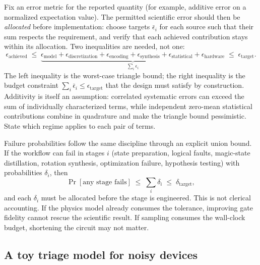 Fix an error metric for the reported quantity (for example, additive error on a normalized expectation value). The permitted scientific error should then be \emph{allocated} before implementation: choose targets $\bar\epsilon_i$ for each source such that their sum respects the requirement, and verify that each achieved contribution stays within its allocation. Two inequalities are needed, not one:
\begin{equation}
\epsilon_{\mathrm{achieved}}
\;\leq\;
\underbrace{\epsilon_{\mathrm{model}}
+\epsilon_{\mathrm{discretization}}
+\epsilon_{\mathrm{encoding}}
+\epsilon_{\mathrm{synthesis}}
+\epsilon_{\mathrm{statistical}}
+\epsilon_{\mathrm{hardware}}}_{\textstyle\sum_i \epsilon_i}
\;\leq\;
\epsilon_{\mathrm{target}}.
\label{eq:error-budget}
\end{equation}
The left inequality is the worst-case triangle bound; the right inequality is the budget constraint $\sum_i\bar\epsilon_i\leq\epsilon_{\mathrm{target}}$ that the design must satisfy by construction. Additivity is itself an assumption: correlated systematic errors can exceed the sum of individually characterized terms, while independent zero-mean statistical contributions combine in quadrature and make the triangle bound pessimistic. State which regime applies to each pair of terms.

Failure probabilities follow the same discipline through an explicit union bound. If the workflow can fail in stages $i$ (state preparation, logical faults, magic-state distillation, rotation synthesis, optimization failure, hypothesis testing) with probabilities $\delta_i$, then
\begin{equation}
\Pr[\text{any stage fails}]\;\leq\;\sum_i \delta_i\;\leq\;\delta_{\mathrm{target}},
\label{eq:delta-union}
\end{equation}
and each $\delta_i$ must be allocated before the stage is engineered. This is not clerical accounting. If the physics model already consumes the tolerance, improving gate fidelity cannot rescue the scientific result. If sampling consumes the wall-clock budget, shortening the circuit may not matter.

\subsection{A toy triage model for noisy devices}

